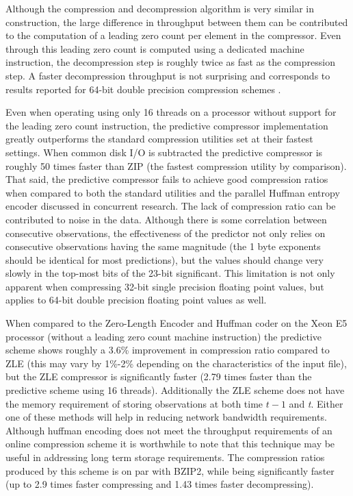 Although the compression and decompression algorithm is very similar in construction, the large difference in throughput between them can be contributed to the computation of a 
leading zero count per element in the compressor. Even through this leading zero count is computed using a dedicated machine instruction, the decompression step is roughly 
twice as fast as the compression step. A faster decompression throughput is not surprising and corresponds to results reported for 64-bit double precision compression schemes 
\cite{4976448,O'Neil:2011:FDC:1964179.1964189}.

Even when operating using only 16 threads on a processor without support for the leading zero count instruction, the predictive compressor implementation greatly outperforms the 
standard compression utilities set at their fastest settings. When common disk I/O is subtracted the predictive compressor is roughly 50 times faster than ZIP (the fastest compression 
utility by comparison). That said, the predictive compressor fails to achieve good compression ratios when compared to both the standard utilities and the parallel Huffman entropy encoder 
discussed in concurrent research. The lack of compression ratio can be contributed to noise in the data. Although there is some correlation between consecutive observations, the effectiveness 
of the predictor not only relies on consecutive observations having the same magnitude (the 1 byte exponents should be identical for most predictions), but the values should change very 
slowly in the top-most bits of the 23-bit significant. This limitation is not only apparent when compressing 32-bit single precision floating point values, but applies to 64-bit double 
precision floating point values as well.

When compared to the Zero-Length Encoder and Huffman coder on the Xeon E5 processor (without a leading zero count machine instruction) the predictive scheme shows roughly a 3.6\% improvement
in compression ratio compared to ZLE (this may vary by 1\%-2\% depending on the characteristics of the input file), but the ZLE compressor is significantly faster (2.79 times faster than
the predictive scheme using 16 threads). Additionally the ZLE scheme does not have the memory requirement of storing observations at both time $t-1$ and \textit{t}. Either one
of these methods will help in reducing network bandwidth requirements. Although huffman encoding does not meet the throughput requirements of an online compression scheme it is worthwhile to note that this technique may be useful in addressing 
long term storage requirements. The compression ratios produced by this scheme is on par with BZIP2, while being significantly faster (up to 2.9 times faster compressing
and 1.43 times faster decompressing).

